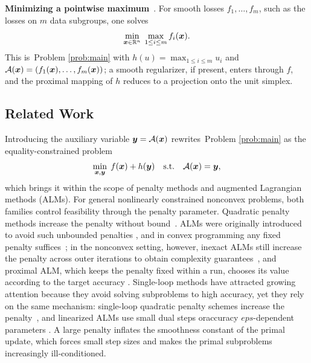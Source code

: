 \textbf{Minimizing a pointwise maximum}~\cite{zhang2020single}.
For smooth losses $f_1,\dots,f_m$, such as the losses on $m$ data subgroups, one solves
\begin{equation*}
  \min_{\bm{x}\in\mathbb{R}^n}\;\max_{1\le i\le m} f_i(\bm{x}).
\end{equation*}
This is~Problem \eqref{prob:main} with $h(u)=\max_{1\le i\le m}u_i$ and
$\mathcal{A}(\bm{x})=(f_1(\bm{x}),\dots,f_m(\bm{x}))$; a smooth regularizer, if present, enters
through $f$, and the proximal mapping of $h$ reduces to a projection onto the unit
simplex.

\subsection{Related Work}

Introducing the auxiliary variable $\bm{y}=\mathcal{A}(\bm{x})$ rewrites~Problem \eqref{prob:main} as
the equality-constrained problem
\begin{equation}\label{prob:split}
  \min_{\bm{x},\bm{y}}\; f(\bm{x})+h(\bm{y})\quad\text{s.t.}\quad \mathcal{A}(\bm{x})=\bm{y},
\end{equation}
which brings it within the scope of penalty methods and augmented Lagrangian methods
(ALMs). For general nonlinearly constrained nonconvex problems, both families control
feasibility through the penalty parameter. Quadratic penalty methods increase the
penalty without bound~\cite{kong2019complexity,lin2022complexity}. ALMs were
originally introduced to avoid such unbounded penalties
\cite{hestenes1969multiplier,powell1969method}, and in convex programming any fixed
penalty suffices~\cite{rockafellar1973multiplier}; in the nonconvex setting, however,
inexact ALMs still increase the penalty across outer iterations to obtain complexity
guarantees~\cite{sahin2019inexact,li2021rate}, and proximal ALM, which keeps the
penalty fixed within a run, chooses its value according to the target accuracy
\cite{xie2021proximal}. Single-loop methods have attracted growing attention because
they avoid solving subproblems to high accuracy, yet they rely on the same mechanism:
single-loop quadratic penalty schemes increase the penalty~\cite{alacaoglu2024complexity},
and linearized ALMs use small dual steps oraccuracy $eps$-dependent parameters
\cite{shi2025momentum}. A large penalty inflates the smoothness constant of the
primal update, which forces small step sizes and makes the primal subproblems
increasingly ill-conditioned.

